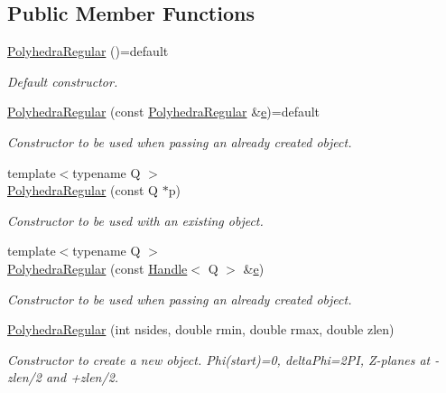 \subsection*{Public Member Functions}
\begin{DoxyCompactItemize}
\item 
\hyperlink{class_d_d4hep_1_1_geometry_1_1_polyhedra_regular_a620021a8adf3f13d0fc6b84675478b78}{Polyhedra\+Regular} ()=default
\begin{DoxyCompactList}\small\item\em Default constructor. \end{DoxyCompactList}\item 
\hyperlink{class_d_d4hep_1_1_geometry_1_1_polyhedra_regular_acfae5af7564277be9bd560f18336eeab}{Polyhedra\+Regular} (const \hyperlink{class_d_d4hep_1_1_geometry_1_1_polyhedra_regular}{Polyhedra\+Regular} \&\hyperlink{_volumes_8cpp_a8a9a1f93e9b09afccaec215310e64142}{e})=default
\begin{DoxyCompactList}\small\item\em Constructor to be used when passing an already created object. \end{DoxyCompactList}\item 
{\footnotesize template$<$typename Q $>$ }\\\hyperlink{class_d_d4hep_1_1_geometry_1_1_polyhedra_regular_a56f02811fd1c82d201c06141ac883623}{Polyhedra\+Regular} (const Q $\ast$p)
\begin{DoxyCompactList}\small\item\em Constructor to be used with an existing object. \end{DoxyCompactList}\item 
{\footnotesize template$<$typename Q $>$ }\\\hyperlink{class_d_d4hep_1_1_geometry_1_1_polyhedra_regular_a4b298b6487ef2b78653c9980a2644b49}{Polyhedra\+Regular} (const \hyperlink{class_d_d4hep_1_1_handle}{Handle}$<$ Q $>$ \&\hyperlink{_volumes_8cpp_a8a9a1f93e9b09afccaec215310e64142}{e})
\begin{DoxyCompactList}\small\item\em Constructor to be used when passing an already created object. \end{DoxyCompactList}\item 
\hyperlink{class_d_d4hep_1_1_geometry_1_1_polyhedra_regular_a81603bb686b56fd58fd78942907c1fb6}{Polyhedra\+Regular} (int nsides, double rmin, double rmax, double zlen)
\begin{DoxyCompactList}\small\item\em Constructor to create a new object. Phi(start)=0, delta\+Phi=2\+PI, Z-\/planes at -\/zlen/2 and +zlen/2. \end{DoxyCompactList}\item 

\end{DoxyCompactItemize}
